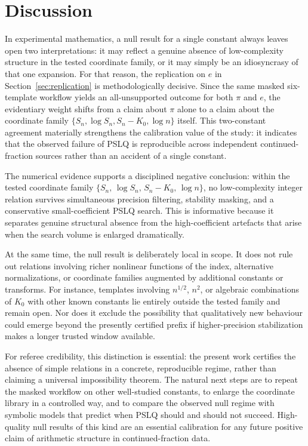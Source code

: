 \documentclass[11pt]{amsart}
\begin{document}


\section{Discussion}

In experimental mathematics, a null result for a single constant always leaves open two interpretations: it may reflect a genuine absence of low-complexity structure in the tested coordinate family, or it may simply be an idiosyncrasy of that one expansion. For that reason, the replication on $e$ in Section~\ref{sec:replication} is methodologically decisive. Since the same masked six-template workflow yields an all-unsupported outcome for both $\pi$ and $e$, the evidentiary weight shifts from a claim about $\pi$ alone to a claim about the coordinate family $\{S_n,\log S_n,S_n-K_0,\log n\}$ itself. This two-constant agreement materially strengthens the calibration value of the study: it indicates that the observed failure of PSLQ is reproducible across independent continued-fraction sources rather than an accident of a single constant.

The numerical evidence supports a disciplined negative conclusion: within the tested coordinate family $\{S_n,\, \log S_n,\, S_n-K_0,\, \log n\}$, no low-complexity integer relation survives simultaneous precision filtering, stability masking, and a conservative small-coefficient PSLQ search. This is informative because it separates genuine structural absence from the high-coefficient artefacts that arise when the search volume is enlarged dramatically.

At the same time, the null result is deliberately local in scope. It does not rule out relations involving richer nonlinear functions of the index, alternative normalizations, or coordinate families augmented by additional constants or transforms. For instance, templates involving $n^{1/2}$, $n^2$, or algebraic combinations of $K_0$ with other known constants lie entirely outside the tested family and remain open. Nor does it exclude the possibility that qualitatively new behaviour could emerge beyond the presently certified prefix if higher-precision stabilization makes a longer trusted window available.

For referee credibility, this distinction is essential: the present work certifies the absence of simple relations in a concrete, reproducible regime, rather than claiming a universal impossibility theorem. The natural next steps are to repeat the masked workflow on other well-studied constants, to enlarge the coordinate library in a controlled way, and to compare the observed null regime with symbolic models that predict when PSLQ should and should not succeed. High-quality null results of this kind are an essential calibration for any future positive claim of arithmetic structure in continued-fraction data.
\end{document}
